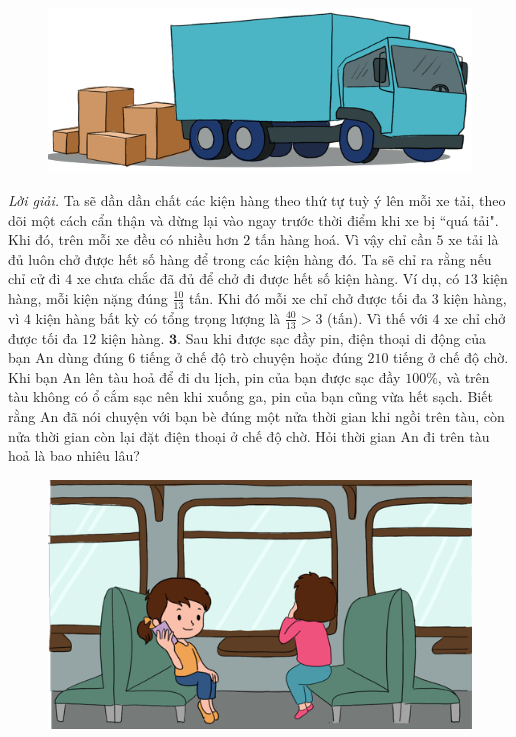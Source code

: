 \begin{multicols}{2}
\begin{figure}[H]
		\centering
		\vspace*{-5pt}
		\captionsetup{labelformat= empty, justification=centering}
		\includegraphics[width=0.85\linewidth]{Pi5_bai2}
		\vspace*{-10pt}
	\end{figure}
	\textit{Lời giải.} 	Ta sẽ dần dần chất các kiện hàng theo thứ tự tuỳ ý lên mỗi xe tải, theo dõi một cách cẩn thận và dừng lại vào ngay trước thời điểm khi xe bị ``quá tải". Khi đó, trên mỗi xe đều có nhiều hơn $2$ tấn hàng hoá. Vì vậy chỉ cần $5$ xe tải là đủ luôn chở được hết số hàng để trong các kiện hàng đó.
	\vskip 0.1cm
	Ta sẽ chỉ ra rằng  nếu chỉ cử đi $4$ xe chưa chắc đã đủ để chở đi được hết số kiện hàng. Ví dụ, có $13$ kiện hàng, mỗi kiện nặng đúng $\frac{10}{13}$ tấn. Khi đó mỗi xe chỉ chở được tối đa $3$ kiện hàng, vì $4$ kiện hàng bất kỳ có tổng trọng lượng là $\frac{40}{13} > 3$ (tấn). Vì thế với $4$ xe chỉ chở được tối đa $12$ kiện hàng.
	\vskip 0.1cm
	$\pmb{3.}$ Sau khi được sạc đầy pin, điện thoại di động của bạn An dùng đúng $6$ tiếng ở chế độ trò chuyện hoặc đúng $210$ tiếng ở chế độ chờ. Khi bạn An lên tàu hoả để đi du lịch, pin của bạn được sạc đầy $100\%$, và trên tàu không có ổ cắm sạc nên khi xuống ga, pin của bạn cũng vừa hết sạch. Biết rằng An đã nói chuyện với bạn bè đúng một nửa thời gian khi ngồi trên tàu, còn nửa thời gian còn lại đặt điện thoại ở chế độ chờ. Hỏi thời gian An đi trên tàu hoả là bao nhiêu lâu?
	\begin{figure}[H]
		\centering
		\vspace*{-5pt}
		\captionsetup{labelformat= empty, justification=centering}
		\includegraphics[width=0.85\linewidth]{Pi5_bai3}

\end{figure}
\end{multicols}
